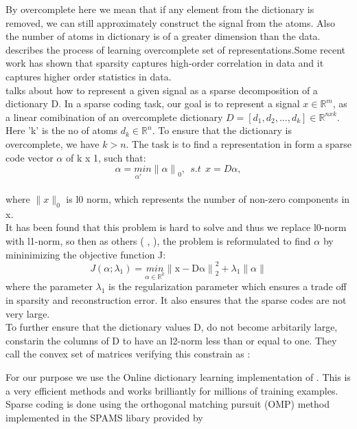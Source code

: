 By overcomplete here we mean that if any element from the dictionary is removed, we can still approximately construct the signal from the atoms. Also the number of atoms in dictionary is of a greater dimension than the data. \citet{lewicki2000learning} describes the process of learning overcomplete set of representations.Some recent work \citep{mairal2009supervised} has shown that sparsity captures high-order correlation in data and it captures higher order statistics in data.\\
 
\citet{huang2006sparse} talks about how to represent a given signal as a sparse decomposition of a dictionary D. In a sparse coding task, our goal is to represent a signal $x \in \mathbb{R}^m$, as a linear comibination of an overcomplete dictionary $D =[d_1,d_2,...,d_k] \in \mathbb{R}^{n x k}$. Here 'k' is the no of atoms $d_k \in \mathbb{R}^n$. To ensure that the dictionary is overcomplete, we have $k > n$. The task is to find a representation in form a sparse code vector $\alpha$ of k x 1, such that:
\begin{equation}\label{eq: sparse coding}
 \alpha = \underset{\alpha '}min {\lVert\alpha \rVert}_0 ,\ \ s.t \ \ x = D \alpha , 
\end{equation}
\\
where $\lVert x \rVert_0$ is l0 norm, which represents the number of non-zero components in x.\\

It has been found that this problem is hard to solve and thus we replace l0-norm with l1-norm, so then as others (\citet{lee2006efficient} , \citet{donoho2006compressed}), the problem is reformulated to find $\alpha$ by mininimizing the objective function J:
\begin{equation}
J(\alpha; \lambda_1) = \underset{\alpha \in \mathbb{R}^k}{min} {\lVert \mathrm{x-D\alpha} \rVert}^2_2 + \lambda_1 \lVert \alpha \rVert
\end{equation}
where the parameter $\lambda_1$ is the regularization parameter which ensures a trade off in sparsity and reconstruction error. It also ensures that the sparse codes are not very large.\\

To further ensure that the dictionary values D, do not become arbitarily large,\citep{mairal2009online} constarin the columns of D to have an l2-norm less than or equal to one. They call the convex set of matrices verifying this constrain as :

For our purpose we use the Online dictionary learning implementation of \citep{mairal2009online}. This is a very efficient methods and works brilliantly for millions of training examples.
Sparse coding is done using the orthogonal matching pursuit (OMP) method  \cite{pati1993orthogonal,tropp2007signal} implemented in the SPAMS libary provided by \citet{mairal2010online}


